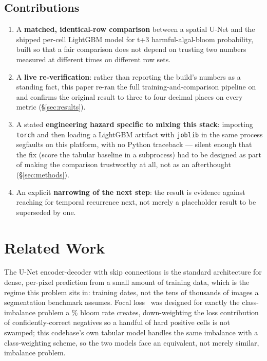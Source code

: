 \subsection{Contributions}

\begin{enumerate}\itemsep2pt
\item A \textbf{matched, identical-row comparison} between a spatial U-Net
and the shipped per-cell LightGBM model for t+3 harmful-algal-bloom
probability, built so that a fair comparison does not depend on trusting two
numbers measured at different times on different row sets.
\item A \textbf{live re-verification}: rather than reporting the
\OrigDate{} build's numbers as a standing fact, this paper re-ran the full
training-and-comparison pipeline on \AsOf{} and confirms the original
result to three to four decimal places on every metric (\S\ref{sec:results}).
\item A stated \textbf{engineering hazard specific to mixing this stack}:
importing \texttt{torch} and then loading a LightGBM artifact with
\texttt{joblib} in the same process segfaults on this platform, with no
Python traceback --- silent enough that the fix (score the tabular baseline
in a subprocess) had to be designed as part of making the comparison
trustworthy at all, not as an afterthought (\S\ref{sec:methods}).
\item An explicit \textbf{narrowing of the next step}: the result is
evidence against reaching for temporal recurrence next, not merely a
placeholder result to be superseded by one.
\end{enumerate}

\section{Related Work}
\label{sec:related}

 The U-Net encoder-decoder with skip connections
\citep{ronneberger2015} is the standard architecture for dense, per-pixel
prediction from a small amount of training data, which is the regime this
problem sits in: \NTrainDates{} training dates, not the tens of thousands of
images a segmentation benchmark assumes. Focal
loss~\citep{lin2017} was designed for exactly the class-imbalance problem a
\BloomRate{}\% bloom rate creates, down-weighting the loss contribution of
confidently-correct negatives so a handful of hard positive cells is not
swamped; this codebase's own tabular model handles the same imbalance with a
class-weighting scheme, so the two models face an equivalent, not merely
similar, imbalance problem.

